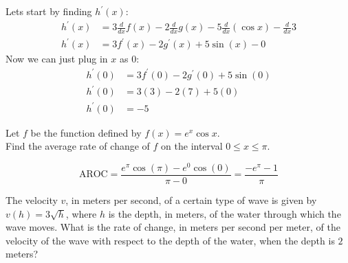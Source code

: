 \documentclass[12pt,letterpaper, onecolumn]{exam}
\begin{document}
\begin{questions}
	
    \begin{solution}
	Lets start by finding $h^\prime(x)$:
	\begin{align*}
		h^\prime(x) &= 3 \frac{d}{dx} f(x) - 2 \frac{d}{dx} g(x) - 5 \frac {d}{dx} (\cos x) - \frac {d}{dx} 3 \\
		h^\prime(x) &= 3f^\prime(x) - 2g^\prime(x) + 5\sin (x) - 0
	\end{align*}
	Now we can just plug in $x$ as $0$:
	\begin{align*}
		h^\prime(0) &= 3f^\prime(0) - 2g^\prime(0) + 5\sin (0) \\
		h^\prime(0) &= 3(3) - 2(7) + 5(0) \\
		h^\prime(0) &= \boxed{-5}
	\end{align*}
    \end{solution}

\question Let $f$ be the function defined by $f(x) = e^{x} \cos x$. \\ Find the average rate of change of $f$ on the interval $ 0 \leq x \leq \pi $.

	\begin{solution}
		$$\text{AROC} = \frac{e^{\pi} \cos(\pi) - e^{0} \cos(0)}{\pi - 0} = \boxed{\frac{-e^{\pi}-1}{\pi}}$$
	\end{solution}

\question The velocity $v$, in meters per second, of a certain type of wave is given by $v(h) = 3\sqrt{h}$, where $h$ is the depth, in meters, of the water through which the wave moves. What is the rate of change, in meters per second per meter, of the velocity of the wave with respect to the depth of the water, when the depth is $2$ meters?

	\begin{parts}

\end{parts}
\end{questions}
\end{document}
